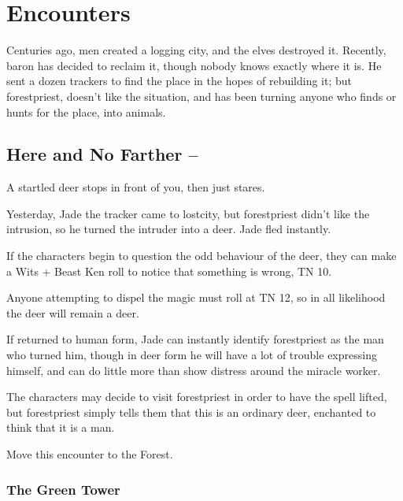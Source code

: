 \section{Encounters}

Centuries ago, men created a logging city, and the elves destroyed it.  Recently, \gls{baron} has decided to reclaim it, though nobody knows exactly where it is.  He sent a dozen trackers to find the place in the hopes of rebuilding it; but \gls{forestpriest}, doesn't like the situation, and has been turning anyone who finds or hunts for the place, into animals.

\subsection[Here and No Farther]{Here and No Farther -- \encnum}\label{herenofarther}

\begin{boxtext}

	A startled deer stops in front of you, then just stares.

\end{boxtext}

Yesterday, Jade the tracker came to \gls{lostcity}, but \gls{forestpriest} didn't like the intrusion, so he turned the intruder into a deer.  Jade fled instantly.

If the characters begin to question the odd behaviour of the deer, they can make a Wits + Beast Ken roll to notice that something is wrong, TN 10.

Anyone attempting to dispel the magic must roll at TN 12, so in all likelihood the deer will remain a deer.


If returned to human form, Jade can instantly identify \gls{forestpriest} as the man who turned him, though in deer form he will have a lot of trouble expressing himself, and can do little more than show distress around the miracle worker.

The characters may decide to visit \gls{forestpriest} in order to have the spell lifted, but \gls{forestpriest} simply tells them that this is an ordinary deer, enchanted to think that it is a man.

Move this encounter to the Forest.

\subsubsection{The Green Tower}

